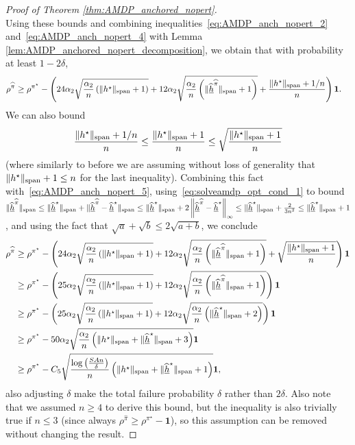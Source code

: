 \documentclass{article}
\theoremstyle{plain}
\theoremstyle{plain}
\theoremstyle{remark}
\theoremstyle{plain}
\theoremstyle{plain}
\newcommand{\pistar}{\pi^\star}
\newcommand{\one}{\mathbf{1}}
\newcommand{\pihat}{\widehat{\pi}}
\newcommand{\hhat}{\widehat{h}}
\newcommand{\hhatanc}{\underline{\hhat}}
\begin{document}
\begin{proof}[Proof of Theorem \ref{thm:AMDP_anchored_nopert}]
\[    \]
    Using these bounds and combining inequalities~\eqref{eq:AMDP_anch_nopert_2} and~\eqref{eq:AMDP_anch_nopert_4} with Lemma \ref{lem:AMDP_anchored_nopert_decomposition}, we obtain that with probability at least $1 - 2\delta$,
    \begin{align}
        \rho^{\pihat} & \geq \rho^{\pistar} - \left(24 \alpha_2 \sqrt{\frac{ \alpha_2 }{n} \left( \spannorm{h^\star} + 1 \right) } + 12 \alpha_2  \sqrt{\frac{\alpha_2}{n}\left(\spannorm{\hhatanc^{\pihat}} + 1\right)} + \frac{ \spannorm{h^\star} + 1/n }{n}\right)\one. \label{eq:AMDP_anch_nopert_5}
    \end{align}
    We can also bound
    \[
        \frac{ \Vert h^\star\Vert _{\textnormal{span}} + 1/n }{n} \leq \frac{ \Vert h^\star\Vert _{\textnormal{span}} + 1 }{n} \leq \sqrt{\frac{ \Vert h^\star\Vert _{\textnormal{span}} + 1 }{n}}
    \]
    (where similarly to before we are assuming without loss of generality that $\Vert h^\star\Vert _{\textnormal{span}} +1\leq n$ for the last inequality). Combining this fact with~\eqref{eq:AMDP_anch_nopert_5}, using~\eqref{eq:solveamdp_opt_cond_1} to bound $\spannorm{\hhatanc^{\pihat}} \leq \spannorm{\hhatanc^{\star}} + \spannorm{\hhatanc^{\pihat} - \hhatanc^{\star}} \leq \spannorm{\hhatanc^{\star}} + 2\infnorm{\hhatanc^{\pihat} - \hhatanc^{\star}} \leq \spannorm{\hhatanc^{\star}} + \frac{2}{3n^2} \leq  \spannorm{\hhatanc^{\star}} + 1$, and using the fact that $\sqrt{a} + \sqrt{b} \leq 2\sqrt{a + b}$, we conclude
    \begin{align*}
        \rho^{\pihat} & \geq \rho^{\pistar} - \left(24 \alpha_2 \sqrt{\frac{ \alpha_2 }{n} \left( \spannorm{h^\star} + 1 \right) } + 12 \alpha_2  \sqrt{\frac{\alpha_2}{n}\left(\spannorm{\hhatanc^{\pihat}} + 1\right)} + \sqrt{\frac{ \spannorm{h^\star} + 1 }{n}} \right)\one \\
        & \geq \rho^{\pistar} - \left(25 \alpha_2 \sqrt{\frac{ \alpha_2 }{n} \left( \spannorm{h^\star} + 1 \right) } + 12 \alpha_2  \sqrt{\frac{\alpha_2}{n}\left(\spannorm{\hhatanc^{\pihat}} + 1\right)} \right)\one \\
        & \geq \rho^{\pistar} - \left(25 \alpha_2 \sqrt{\frac{ \alpha_2 }{n} \left( \spannorm{h^\star} + 1 \right) } + 12 \alpha_2  \sqrt{\frac{\alpha_2}{n}\left(\spannorm{\hhatanc^{\star}} + 2\right)} \right)\one \\
        &\geq \rho^{\pistar} - 50 \alpha_2 \sqrt{\frac{ \alpha_2}{n} \left( \spannorm{h^\star} + \spannorm{\hhatanc^{\star}} + 3\right) }\one \\
        & \geq \rho^{\pistar} - C_5 \sqrt{\frac{ \log \left(\frac{SAn}{\delta} \right)}{n} \left( \spannorm{h^\star} + \spannorm{\hhatanc^{\star}} + 1\right) }\one, 
    \end{align*}
    also adjusting $\delta$ make the total failure probability $\delta$ rather than $2\delta$. Also note that we assumed $n \geq 4$ to derive this bound, but the inequality is also trivially true if $n \leq 3$ (since always $\rho^{\pihat} \geq \rho^{\pistar} - \one$), so this assumption can be removed without changing the result.
    
\end{proof}
\end{document}
